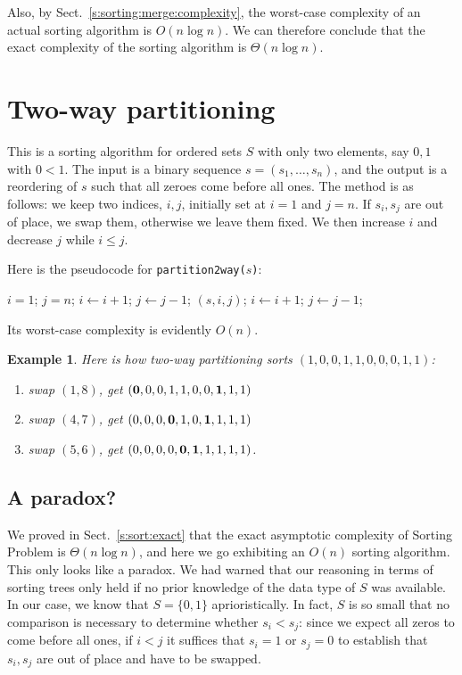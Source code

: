 \documentclass[a4paper]{book}
\theoremstyle{changebreak}                %
\newtheorem{eg}[result]{Example}
\begin{document}
Also, by Sect.~\ref{s:sorting:merge:complexity}, the worst-case
complexity of an actual sorting algorithm is $O(n\log n)$. We can
therefore conclude that the exact complexity of the sorting algorithm
is $\Theta(n\log n)$. 

\section{Two-way partitioning}
This is a sorting algorithm for ordered sets
$S$ with only two elements, say $0,1$ with $0<1$. The input is a
binary sequence $s=(s_1,\ldots,s_n)$, and the
output is a reordering of $s$ such that all zeroes come before all
ones. The method is as follows: we keep two indices,
$i,j$, initially set at $i=1$ and $j=n$. If $s_i,s_j$ are out of
place, we swap them, otherwise we leave them fixed. We then increase
$i$ and decrease $j$ while $i\le j$. 

Here is the pseudocode for {\tt partition2way($s$)}:
\begin{algorithmic}[1]
\STATE $i=1$; $j=n$;
    \STATE $i\leftarrow i+1$;
    \STATE $j\leftarrow j-1$;
  \ELSE
    $(s,i,j)$;
    \STATE $i\leftarrow i+1$;
    \STATE $j\leftarrow j-1$;
  \ENDIF
\ENDWHILE    
\end{algorithmic}
Its worst-case complexity is evidently
$O(n)$. 

\begin{eg}
Here is how two-way partitioning sorts $(1,0,0,1,1,0,0,0,1,1)$: 
\begin{enumerate}
\item swap $(1,8)$, get $({\bf 0},0,0,1,1,0,0,{\bf 1},1,1)$ 
\item swap $(4,7)$, get $(0,0,0,{\bf 0},1,0,{\bf 1},1,1,1)$ 
\item swap $(5,6)$, get $(0,0,0,0,{\bf 0},{\bf 1},1,1,1,1)$.
\end{enumerate}
\end{eg}

\subsection{A paradox?}
We proved in Sect.~\ref{s:sort:exact} that the exact asymptotic
complexity of
{\sc Sorting Problem} is
$\Theta(n\log n)$, and here we go exhibiting an $O(n)$ sorting
algorithm. This only looks like a
paradox. We had warned that our reasoning in terms of
sorting trees only held if no prior knowledge of
the data type of $S$ was available. In our case, we know that
$S=\{0,1\}$ aprioristically. In fact, $S$ is so small that no
comparison is necessary to determine whether
$s_i<s_j$: since we expect all zeros to come before all ones, if $i<j$
it suffices that $s_i=1$ or $s_j=0$ to establish that $s_i,s_j$ are
out of place and have to be swapped.
\end{document}

